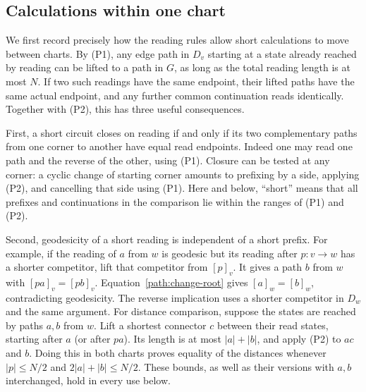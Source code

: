 \documentclass[11pt,reqno]{amsart}
\numberwithin{equation}{section}
\theoremstyle{definition}
\theoremstyle{remark}
\begin{document}
\subsection{Calculations within one chart}

We first record precisely how the reading rules allow short calculations
to move between charts.  By (P1), any edge path in $D_v$ starting at a
state already reached by reading can be lifted to a path in $G$, as long
as the total reading length is at most $N$.  If two such readings have the
same endpoint, their lifted paths have the same actual endpoint, and any
further common continuation reads identically.  Together with (P2), this
has three useful consequences.

First, a short circuit closes on reading if and only if its two
complementary paths from one corner to another have equal read endpoints.
Indeed one may read one path and the reverse of the other, using (P1).
Closure can be tested at any corner: a cyclic change of starting corner
amounts to prefixing by a side, applying (P2), and cancelling that side
using (P1).  Here and below, ``short'' means that all prefixes and
continuations in the comparison lie within the ranges of (P1) and (P2).

Second, geodesicity of a short reading is independent of a short prefix.
For example, if the reading of $a$ from $w$ is geodesic but its reading
after $p:v\to w$ has a shorter competitor, lift that competitor from
$[p]_v$.  It gives a path $b$ from $w$ with
$[pa]_v=[pb]_v$.  Equation~\eqref{path:change-root} gives
$[a]_w=[b]_w$, contradicting geodesicity.  The reverse implication uses a
shorter competitor in $D_w$ and the same argument.  For distance
comparison, suppose the states are reached by paths $a,b$ from $w$.
Lift a shortest connector $c$ between their read states, starting after
$a$ (or after $pa$).  Its length is at most $|a|+|b|$, and apply (P2)
to $ac$ and $b$.  Doing this in both charts proves equality of the
distances whenever $|p|\le N/2$ and $2|a|+|b|\le N/2$.
These bounds, as well as their versions with $a,b$ interchanged, hold
in every use below.
\end{document}
